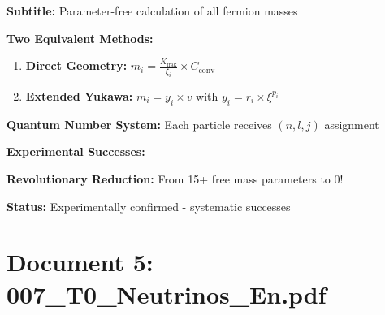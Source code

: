 	\begin{documentbox}
		\textbf{Subtitle:} Parameter-free calculation of all fermion masses
		
		\textbf{Two Equivalent Methods:}
		\begin{enumerate}
			\item \textbf{Direct Geometry:} $m_i = \frac{K_{\text{frak}}}{\xi_i} \times C_{\text{conv}}$
			\item \textbf{Extended Yukawa:} $m_i = y_i \times v$ with $y_i = r_i \times \xi^{p_i}$
		\end{enumerate}
		
		\textbf{Quantum Number System:} Each particle receives $(n,l,j)$ assignment
		
		\textbf{Experimental Successes:}
		\begin{center}
		\end{center}
		
		\textbf{Revolutionary Reduction:} From 15+ free mass parameters to 0!
		
		\textbf{Status:} Experimentally confirmed - systematic successes
	\end{documentbox}
	
	\section{Document 5: 007\_T0\_Neutrinos\_En.pdf}
	
